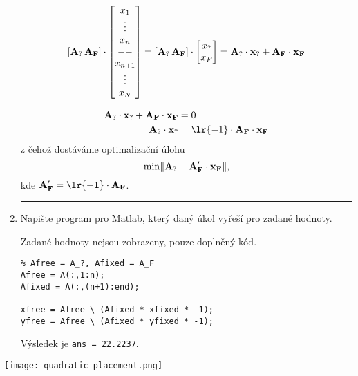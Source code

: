 \begin{enumerate}
    \[
        \left[ \bf{A}_? \, \bf{A}_F \right] \cdot
        \begin{bmatrix}
            x_1 \\
            \vdots \\
            x_n \\
            -- \\
            x_{n + 1}\\
            \vdots \\
            x_N
        \end{bmatrix}
        =
        \left[ \bf{A}_? \, \bf{A}_F \right] \cdot
        \begin{bmatrix}
            x_{?} \\
            x_{F}
        \end{bmatrix}
        = \bf{A}_? \cdot x_? + \bf{A}_F \cdot x_{F}
    \]

    \begin{align*}
        \bf{A}_? \cdot x_? + \bf{A}_F \cdot x_{F} &= 0 \\
        \bf{A}_? \cdot x_? &= \lr{-1} \cdot \bf{A}_F \cdot x_{F}
    \end{align*}
    z čehož dostáváme optimalizační úlohu
    \[    
        \min \lVert \bf{A}_? - \bf{A}'_F \cdot x_{F} \rVert,
    \]
    kde \( \bf{A}'_F = \lr{-1} \cdot \bf{A}_F \).

    \noindent\rule{\textwidth}{1pt}

    \item Napište program pro Matlab, který daný úkol vyřeší pro zadané hodnoty.

    Zadané hodnoty nejsou zobrazeny, pouze doplněný kód.

    \begin{lstlisting}
% Afree = A_?, Afixed = A_F
Afree = A(:,1:n);
Afixed = A(:,(n+1):end);

xfree = Afree \ (Afixed * xfixed * -1);
yfree = Afree \ (Afixed * yfixed * -1);
    \end{lstlisting}

    Výsledek je \verb|ans = 22.2237|.
\end{enumerate}

\begin{center}
    \texttt{[image: quadratic\_placement.png]}
\end{center}

